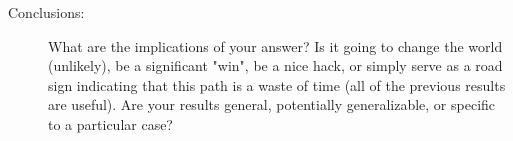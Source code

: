 \begin{description}
  \item[Conclusions:] What are the implications of your answer? Is it going to change the world (unlikely),
be a significant "win", be a nice hack, or simply serve as a road sign indicating that this path is
a waste of time (all of the previous results are useful). Are your results general, potentially
generalizable, or specific to a particular case?

\end{description}




\smallskip


